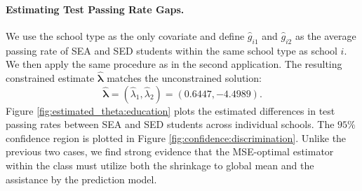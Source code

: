 \documentclass[12pt,letterpaper]{article}
\begin{document}
\paragraph{Estimating Test Passing Rate Gaps.} 
We use the school type as the only covariate and define $\hat{g}_{i1}$ and $\hat{g}_{i2}$ as the average passing rate of SEA and SED students within the same school type as school $i$. We then apply the same procedure as in the second application. The resulting constrained estimate $\hat{\boldsymbol\lambda}$ matches the unconstrained solution:
\begin{equation}\label{eq:lambda:education}
    \hat{\boldsymbol\lambda} = (\hat{\lambda}_1,\hat{\lambda}_2)=(0.6447,-4.4989).
\end{equation}
Figure \ref{fig:estimated_theta:education} plots the estimated differences in test passing rates between SEA and SED students across individual schools. The $95\%$ confidence region is plotted in Figure \ref{fig:confidence:discrimination}. Unlike the previous two cases, we find strong evidence that the MSE-optimal estimator within the class must utilize both the shrinkage to global mean and the assistance by the prediction model. 
\end{document}
